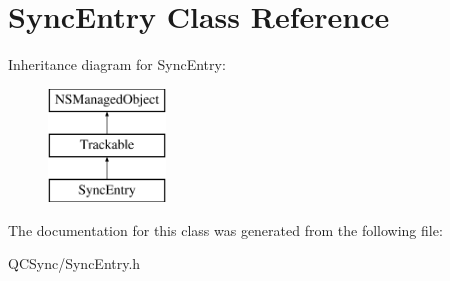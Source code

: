 \hypertarget{interface_sync_entry}{
\section{SyncEntry Class Reference}
\label{interface_sync_entry}
}
Inheritance diagram for SyncEntry:\begin{figure}[H]
\begin{center}
\leavevmode
\includegraphics[height=3.000000cm]{interface_sync_entry}
\end{center}
\end{figure}


The documentation for this class was generated from the following file:\begin{DoxyCompactItemize}
\item 
QCSync/SyncEntry.h\end{DoxyCompactItemize}
